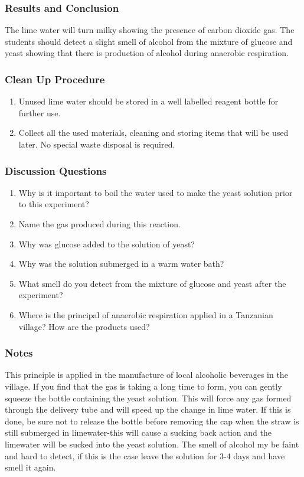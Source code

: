 \subsubsection*{Results and Conclusion}
The lime water will turn milky showing the presence of carbon dioxide gas.
The students should detect a slight smell of alcohol from the mixture of glucose and yeast showing that there is production of alcohol during anaerobic respiration.

\subsubsection*{Clean Up Procedure}
\begin{enumerate}
\item{Unused lime water should be stored in a well labelled reagent bottle for further use.}
\item{Collect all the used materials, cleaning and storing items that will be used later. No special waste disposal is required.}
\end{enumerate}

\subsubsection*{Discussion Questions}
\begin{enumerate}
\item{Why is it important to boil the water used to make the yeast solution prior to this experiment?}
\item{Name the gas produced during this reaction.}
\item{Why was glucose added to the solution of yeast?}
\item{Why was the solution submerged in a warm water bath?}
\item{What smell do you detect from the mixture of glucose and yeast after the experiment?}
\item{Where is the principal of anaerobic respiration applied in a Tanzanian village? How are the products used?}
\end{enumerate}

\subsubsection*{Notes}
This principle is applied in the manufacture of local alcoholic beverages in the village.
If you find that the gas is taking a long time to form, you can gently squeeze the bottle containing the yeast solution. This will force any gas formed through the delivery tube and will speed up the change in lime water. If this is done, be sure not to release the bottle before removing the cap when the straw is still submerged in limewater-this will cause a sucking back action and the limewater will be sucked into the yeast solution.
The smell of alcohol my be faint and hard to detect, if this is the case leave the solution for 3-4 days and have  smell it again.